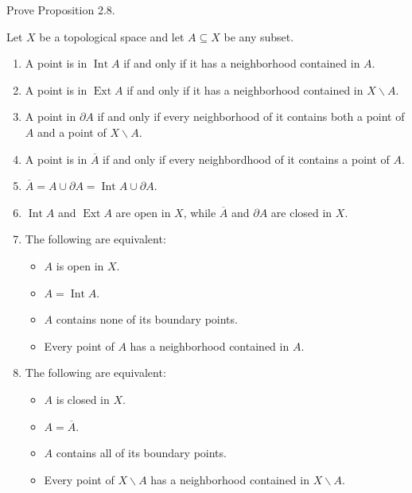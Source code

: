 \begin{exercise}{2.9}\label{exercise:2.9}
	Prove Proposition 2.8.

	Let $X$ be a topological space and let $A\subseteq X$ be any subset.

	\begin{enumerate}[label={(\alph*)}]
		\item A point is in $\operatorname{Int} A$ if and only if it has a neighborhood contained in $A$.
		\item A point is in $\operatorname{Ext} A$ if and only if it has a neighborhood contained in $X\smallsetminus A$.
		\item A point in $\partial A$ if and only if every neighborhood of it contains both a point of $A$ and a point of $X\smallsetminus A$.
		\item A point is in $\overline{A}$ if and only if every neighbordhood of it contains a point of $A$.
		\item $\overline{A} = A\cup \partial A = \operatorname{Int} A\cup \partial A$.
		\item $\operatorname{Int} A$ and $\operatorname{Ext}A$ are open in $X$, while $\overline{A}$ and $\partial A$ are closed in $X$.
		\item The following are equivalent:
		      \begin{itemize}
			      \item $A$ is open in $X$.
			      \item $A = \operatorname{Int} A$.
			      \item $A$ contains none of its boundary points.
			      \item Every point of $A$ has a neighborhood contained in $A$.
		      \end{itemize}
		\item The following are equivalent:
		      \begin{itemize}
			      \item $A$ is closed in $X$.
			      \item $A = \overline{A}$.
			      \item $A$ contains all of its boundary points.
			      \item Every point of $X\smallsetminus A$ has a neighborhood contained in $X\smallsetminus A$.
		      \end{itemize}
	\end{enumerate}
\end{exercise}

